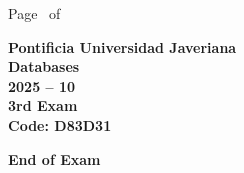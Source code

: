 \documentclass[11pt, addpoints, answers]{exam}\usepackage[utf8]{inputenc}
\begin{document}
\begin{coverpages}
\begin{center}
			\vspace{3mm}
			\leavevmode \hspace{5mm} 
		\end{center}
	\end{coverpages}

	\footer{} {Page \thepage\ of \numpages} {}

	\centering
	\textbf{\Large Pontificia Universidad Javeriana}\\
	\textbf{\Large Databases} \\
	\textbf{\large 2025 -- 10} \\
	\textbf{\large 3rd Exam} \\
	\textbf{Code: D83D31}


	\begin{questions}
		
		
		
		
		
		
		
		
		
		
		
		
		
		
		
		
		
		
		
		
	\end{questions}

	\vspace{5mm}
	\noindent \textbf{End of Exam}
\end{document}
